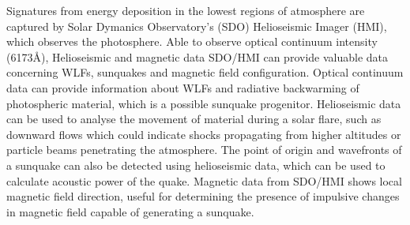 Signatures from energy deposition in the lowest regions of atmosphere are captured by Solar Dymanics Observatory's (SDO) Helioseismic Imager (HMI), which observes the photosphere. Able to observe optical continuum intensity (6173Å), Helioseismic and magnetic data SDO/HMI can provide valuable data concerning WLFs, sunquakes and magnetic field configuration. Optical continuum data can provide information about WLFs and radiative backwarming of photospheric material, which is a possible sunquake progenitor. Helioseismic data can be used to analyse the movement of material during a solar flare, such as downward flows which could indicate shocks propagating from higher altitudes or particle beams penetrating the atmosphere. The point of origin and wavefronts of a sunquake can also be detected using helioseismic data, which can be used to calculate acoustic power of the quake. Magnetic data from SDO/HMI shows local magnetic field direction, useful for determining the presence of impulsive changes in magnetic field capable of generating a sunquake.     




